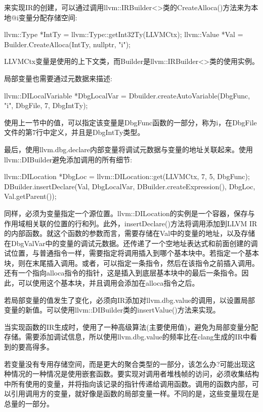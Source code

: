 来实现IR的创建，可以通过调用llvm::IRBuilder<>类的CreateAlloca()方法来为本地@i变量分配存储空间:

\begin{cpp}
llvm::Type *IntTy = llvm::Type::getInt32Ty(LLVMCtx);
llvm::Value *Val = Builder.CreateAlloca(IntTy, nullptr, "i");
\end{cpp}

LLVMCtx变量是使用的上下文类，而Builder是llvm::IRBuilder<>类的使用实例。

局部变量也需要通过元数据来描述:

\begin{cpp}
llvm::DILocalVariable *DbgLocalVar =
    Dbuilder.createAutoVariable(DbgFunc, "i", DbgFile,
                                7, DbgIntTy);
\end{cpp}

使用上一节中的值，可以指定该变量是DbgFunc函数的一部分，称为i，在DbgFile文件的第7行中定义，并且是DbgIntTy类型。

最后，使用llvm.dbg.declare内部变量将调试元数据与变量的地址关联起来。使用llvm::DIBuilder避免添加调用的所有细节:

\begin{cpp}
llvm::DILocation *DbgLoc =
                llvm::DILocation::get(LLVMCtx, 7, 5, DbgFunc);
DBuilder.insertDeclare(Val, DbgLocalVar,
                        DBuilder.createExpression(), DbgLoc,
                        Val.getParent());
\end{cpp}

同样，必须为变量指定一个源位置。llvm::DILocation的实例是一个容器，保存与作用域相关联的位置的行和列。此外，insertDeclare()方法将调用添加到LLVM IR的内部函数。就这个函数的参数而言，需要存储在Val中的变量的地址，以及存储在DbgValVar中的变量的调试元数据。还传递了一个空地址表达式和前面创建的调试位置，与普通指令一样，需要指定将调用插入到哪个基本块中。若指定一个基本块，则在末尾插入调用。或者，可以指定一条指令，然后在该指令之前插入调用。还有一个指向alloca指令的指针，这是插入到底层基本块中的最后一条指令。因此，可以使用这个基本块，并且调用会添加在alloca指令之后。

若局部变量的值发生了变化，必须向IR添加对llvm.dbg.value的调用，以设置局部变量的新值。可以使用llvm::DIBuilder类的insertValue()方法来实现。

当实现函数的IR生成时，使用了一种高级算法(主要使用值)，避免为局部变量分配存储。需要添加调试信息，所以使用llvm.dbg.value的频率比在clang生成的IR中看到的要高得多。

若变量没有专用存储空间，而是更大的聚合类型的一部分，该怎么办?可能出现这种情况的一种情况是使用嵌套函数。要实现对调用者堆栈帧的访问，必须收集结构中所有使用的变量，并将指向该记录的指针传递给调用函数。调用的函数内部，可以引用调用方的变量，就好像是函数的局部变量一样。不同的是，这些变量现在是总量的一部分。

